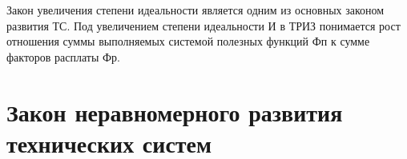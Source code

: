Закон увеличения степени идеальности является одним из основных законом развития ТС. Под увеличением степени идеальности И в ТРИЗ понимается рост отношения суммы выполняемых системой полезных функций Фп к сумме факторов расплаты Фр.







\section{Закон неравномерного развития технических систем}






\newpage